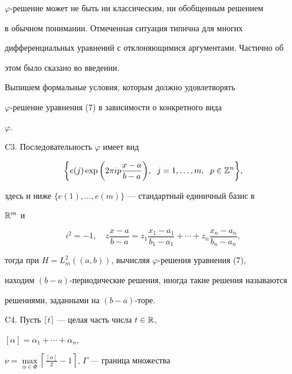 $\varphi$-решение может не быть ни классическим, ни обобщенным решением 


в обычном понимании. Отмеченная ситуация типична для многих 


дифференциальных уравнений с отклоняющимися аргументами. Частично об 


этом было сказано во введении. 


 


Выпишем формальные условия, которым должно удовлетворять 


$\varphi$-решение уравнения (7) в зависимости о конкретного вида 


$\varphi$. 


\medskip 


 


C3. Последовательность $\varphi$ имеет вид 


\begin{equation} 


\bigg\{e(j)\exp\bigg(2\pi ip 


\frac{x-a}{b-a}\bigg),\ \;j=1,\dotsc,m, 


\ \; p\in\Bbb Z^n\bigg\}, 


\end{equation} 


здесь и ниже $\{e(1),\dotsc,e(m)\}$ --- стандартный единичный базис в 


$\Bbb R^m$ и 


$$ 


i^2=-1,\quad z\frac{x-a}{b-a}=z_1\frac{x_1-a_1}{b_1-a_1}+ 


\dotsb+z_n\frac{x_n-a_n}{b_n-a_n}, 


$$ 


тогда при $H=L^2_m((a,b))$, вычисляя $\varphi$-решения уравнения (7), 


находим $(b-a)$-периодические решения, иногда такие решения называются 


решениями, заданными на $(b-a)$-торе. 


\medskip 


 


C4. Пусть $\lceil t\rceil$ --- целая часть числа $t\in\Bbb R$, 


$[\alpha]=\alpha_1+\dotsb+\alpha_n$, 


$\nu=\max\limits_{\alpha\in\Phi}\left\lceil 


\frac{[\alpha]}{2}-1\right\rceil$, $\Gamma$ --- граница множества 


